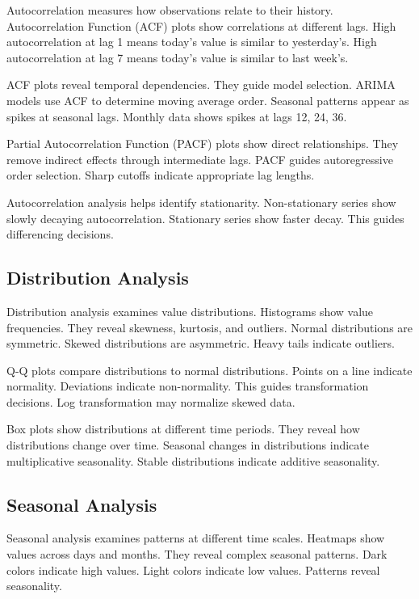 Autocorrelation measures how observations relate to their history. Autocorrelation Function (ACF) plots show correlations at different lags. High autocorrelation at lag 1 means today's value is similar to yesterday's. High autocorrelation at lag 7 means today's value is similar to last week's.

ACF plots reveal temporal dependencies. They guide model selection. ARIMA models use ACF to determine moving average order. Seasonal patterns appear as spikes at seasonal lags. Monthly data shows spikes at lags 12, 24, 36.

Partial Autocorrelation Function (PACF) plots show direct relationships. They remove indirect effects through intermediate lags. PACF guides autoregressive order selection. Sharp cutoffs indicate appropriate lag lengths.

Autocorrelation analysis helps identify stationarity. Non-stationary series show slowly decaying autocorrelation. Stationary series show faster decay. This guides differencing decisions.

\subsection{Distribution Analysis}

Distribution analysis examines value distributions. Histograms show value frequencies. They reveal skewness, kurtosis, and outliers. Normal distributions are symmetric. Skewed distributions are asymmetric. Heavy tails indicate outliers.

Q-Q plots compare distributions to normal distributions. Points on a line indicate normality. Deviations indicate non-normality. This guides transformation decisions. Log transformation may normalize skewed data.

Box plots show distributions at different time periods. They reveal how distributions change over time. Seasonal changes in distributions indicate multiplicative seasonality. Stable distributions indicate additive seasonality.

\subsection{Seasonal Analysis}

Seasonal analysis examines patterns at different time scales. Heatmaps show values across days and months. They reveal complex seasonal patterns. Dark colors indicate high values. Light colors indicate low values. Patterns reveal seasonality.

